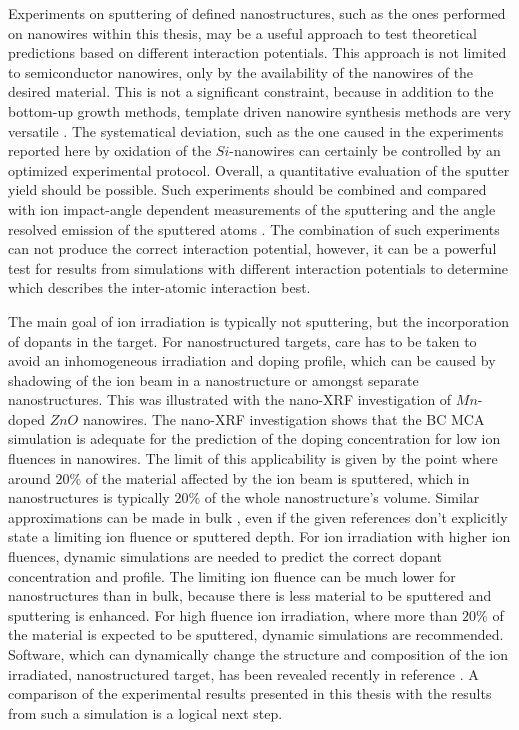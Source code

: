 Experiments on sputtering of defined nanostructures, such as the ones performed on nanowires within this thesis, may be a useful approach to test theoretical predictions based on different interaction potentials. This approach is not limited to semiconductor nanowires, only by the availability of the nanowires of the desired material. This is not a significant constraint, because in addition to the bottom-up growth methods, template driven nanowire synthesis methods are very versatile \cite{martin_membrane-based_1996}. The systematical deviation, such as the one caused in the experiments reported here by oxidation of the $Si$-nanowires can certainly be controlled by an optimized experimental protocol. Overall, a quantitative evaluation of the sputter yield should be possible. Such experiments should be combined and compared with ion impact-angle dependent measurements of the sputtering \cite{hofsass_simulation_2014} and the angle resolved emission of the sputtered atoms \cite{wirtz_storing_2008,verdeil_angular_2008}. The combination of such experiments can not produce the correct interaction potential, however, it can be a powerful test for results from simulations with different interaction potentials to determine which describes the inter-atomic interaction best.

The main goal of ion irradiation is typically not sputtering, but the incorporation of dopants in the target. For nanostructured targets, care has to be taken to avoid an inhomogeneous irradiation and doping profile, which can be caused by shadowing of the ion beam in a nanostructure or amongst separate nanostructures. This was illustrated with the nano-XRF investigation of $Mn$-doped $ZnO$ nanowires. The nano-XRF investigation shows that the BC MCA simulation is adequate for the prediction of the doping concentration for low ion fluences in nanowires. The limit of this applicability is given by the point where around $20\%$ of the material affected by the ion beam is sputtered, which in nanostructures is typically $20\%$ of the whole nanostructure's volume. Similar approximations can be made in bulk \cite{moller_tridyn_1984,andersen_computer_1986,moller_tridyn-binary_1988,sigmund_alloy_1993,zaporozchenko_preferential_1995}, even if the given references don't explicitly state a limiting ion fluence or sputtered depth. For ion irradiation with higher ion fluences, dynamic simulations are needed to predict the correct dopant concentration and profile. The limiting ion fluence can be much lower for nanostructures than in bulk, because there is less material to be sputtered and sputtering is enhanced. For high fluence ion irradiation, where more than $20\%$ of the material is expected to be sputtered, dynamic simulations are recommended. Software, which can dynamically change the structure and composition of the ion irradiated, nanostructured target, has been revealed recently in reference \cite{moller_tri3dyn_2014}. A comparison of the experimental results presented in this thesis with the results from such a simulation is a logical next step.

